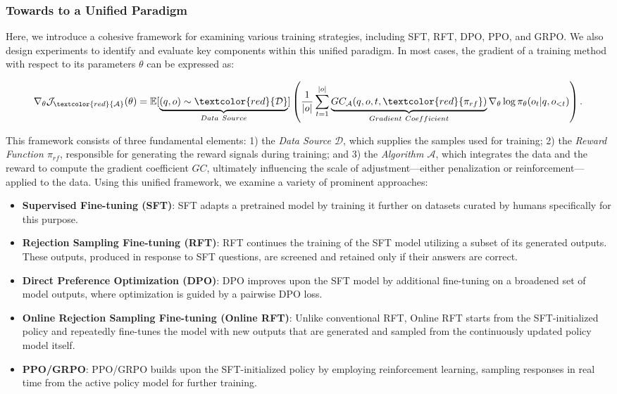 \begin{itemize}[topsep=0pt]
\subsubsection{Towards to a Unified Paradigm} Here, we introduce a cohesive framework for examining various training strategies, including SFT, RFT, DPO, PPO, and GRPO. We also design experiments to identify and evaluate key components within this unified paradigm. In most cases, the gradient of a training method with respect to its parameters $\theta$ can be expressed as:

\begin{equation}
    \nabla_{\theta}\mathcal{J}_{\textcolor{red}{\mathcal{A}}}(\theta) = \mathbb{E}[\underbrace{(q,o) \sim \textcolor{red}{\mathcal{D}}}_{Data \ Source}]\left( \frac{1}{|o|} \sum_{t=1}^{|o|}  \underbrace{GC_{{\mathcal{A}}}(q, o, t, \textcolor{red}{\pi_{{rf}}})}_{Gradient \ Coefficient}  \nabla_{\theta}\log \pi_{\theta}(o_t | q, o_{<t})\right).
\label{eq:objective}
\end{equation}

This framework consists of three fundamental elements: 1) the \textit{Data Source $\mathcal{D}$}, which supplies the samples used for training; 2) the \textit{Reward Function $\pi_{{rf}}$}, responsible for generating the reward signals during training; and 3) the \textit{Algorithm $\mathcal{A}$}, which integrates the data and the reward to compute the gradient coefficient $GC$, ultimately influencing the scale of adjustment—either penalization or reinforcement—applied to the data. Using this unified framework, we examine a variety of prominent approaches:

\begin{itemize}
    \item \textbf{Supervised Fine-tuning (SFT)}: SFT adapts a pretrained model by training it further on datasets curated by humans specifically for this purpose.
    \item \textbf{Rejection Sampling Fine-tuning (RFT)}: RFT continues the training of the SFT model utilizing a subset of its generated outputs. These outputs, produced in response to SFT questions, are screened and retained only if their answers are correct.
    \item \textbf{Direct Preference Optimization (DPO)}: DPO improves upon the SFT model by additional fine-tuning on a broadened set of model outputs, where optimization is guided by a pairwise DPO loss.
    \item \textbf{Online Rejection Sampling Fine-tuning (Online RFT)}: Unlike conventional RFT, Online RFT starts from the SFT-initialized policy and repeatedly fine-tunes the model with new outputs that are generated and sampled from the continuously updated policy model itself.
    \item \textbf{PPO/GRPO}: PPO/GRPO builds upon the SFT-initialized policy by employing reinforcement learning, sampling responses in real time from the active policy model for further training.
\end{itemize}


\end{itemize}
